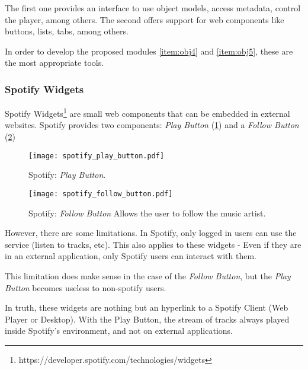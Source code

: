       The first one provides an interface to use object models, access metadata, control the player, among others.
      The second offers support for web components like buttons, lists, tabs, among others.

      In order to develop the proposed modules \ref{item:obj4} and \ref{item:obj5}, these are the most appropriate tools.



    \subsubsection{Spotify Widgets} %
    \label{ssub:spotify_widgets}

      Spotify Widgets\footnote{https://developer.spotify.com/technologies/widgets} are small web components that can be embedded in external websites.
      Spotify provides two components: \emph{Play Button} (\ref{fig:spotify_play_button}) and a \emph{Follow Button} (\ref{fig:spotify_follow_button})

      \begin{figure}
        \begin{center}
          \texttt{[image: spotify\_play\_button.pdf]}
        \end{center}
        \caption{Spotify: \emph{Play Button}.}
        \label{fig:spotify_play_button}
      \end{figure}

      \begin{figure}
        \begin{center}
          \texttt{[image: spotify\_follow\_button.pdf]}
        \end{center}
        \caption{Spotify: \emph{Follow Button} Allows the user to follow the music artist.}
        \label{fig:spotify_follow_button}
      \end{figure}

      However, there are some limitations.
      In Spotify, only logged in users can use the service (listen to tracks, etc).
      This also applies to these widgets - Even if they are in an external application, only Spotify users can interact with them.

      This limitation does make sense in the case of the \emph{Follow Button}, but the \emph{Play Button} becomes useless to non-spotify users.

      In truth, these widgets are nothing but an hyperlink to a Spotify Client (Web Player or Desktop).
      With the Play Button, the stream of tracks always played inside Spotify's environment, and not on external applications.

